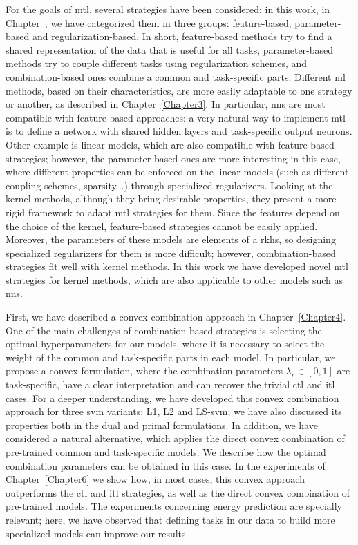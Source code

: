 For the goals of \acrshort{mtl}, several strategies have been considered; in this work, in Chapter~, we have categorized them in three groups: feature-based, parameter-based and regularization-based.
In short, feature-based methods try to find a shared representation of the data that is useful for all tasks, parameter-based methods try to couple different tasks using regularization schemes, and combination-based ones combine a common and task-specific parts.
Different \acrshort{ml} methods, based on their characteristics, are more easily adaptable to one strategy or another, as described in Chapter~\ref{Chapter3}. In particular, \acrshort{nns} are most compatible with feature-based approaches: a very natural way to implement \acrshort{mtl} is to define a network with shared hidden layers and task-specific output neurons.
Other example is linear models, which are also compatible with feature-based strategies; however, the parameter-based ones are more interesting in this case, where different properties can be enforced on the linear models (such as different coupling schemes, sparsity...) through specialized regularizers.
Looking at the kernel methods, although they bring desirable properties, they present a more rigid framework to adapt \acrshort{mtl} strategies for them. Since the features depend on the choice of the kernel, feature-based strategies cannot be easily applied. Moreover, the parameters of these models are elements of a \acrfull{rkhs}, so designing specialized regularizers for them is more difficult; however, combination-based strategies fit well with kernel methods.
%
In this work we have developed novel \acrshort{mtl} strategies for kernel methods, which are also applicable to other models such as \acrshort{nns}.


%
First, we have described a convex combination approach in Chapter~\ref{Chapter4}. One of the main challenges of combination-based strategies is selecting the optimal hyperparameters for our models, where it is necessary to select the weight of the common and task-specific parts in each model. In particular, we propose a convex formulation, where the combination parameters $\lambda_r \in [0, 1]$ are task-specific, have a clear interpretation and can recover the trivial \acrshort{ctl} and \acrshort{itl} cases.
%
For a deeper understanding, we have developed this convex combination approach for three \acrshort{svm} variants: L1, L2 and LS-\acrshort{svm}; we have also discussed its properties both in the dual and primal formulations.
%
In addition, we have considered a natural alternative, which applies the direct convex combination of pre-trained common and task-specific models. We describe how the optimal combination parameters can be obtained in this case.
%
In the experiments of Chapter~\ref{Chapter6} we show how, in most cases, this convex approach outperforms the \acrshort{ctl} and \acrshort{itl} strategies, as well as the direct convex combination of pre-trained models.
The experiments concerning energy prediction are specially relevant; here, we have observed that defining tasks in our data to build more specialized models can improve our results.

